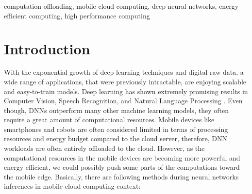\documentclass[conference,9pt]{IEEEtran}
\begin{document}
\begin{IEEEkeywords}
computation offloading, mobile cloud computing, deep neural networks, energy efficient computing, high performance computing
\end{IEEEkeywords}

\section{Introduction}
With the exponential growth of deep learning techniques and digital raw data, a wide range of applications, that were previously intractable, are enjoying scalable and easy-to-train models. Deep learning has shown extremely promising results in Computer Vision\cite{b1}\cite{b2}, Speech Recognition\cite{b3}, and Natural Language Processing \cite{b4}. Even though, DNNs outperform many other machine learning models, they often require a great amount of computational resources. Mobile devices like smartphones and robots are often considered limited in terms of processing resources and energy budget compared to the cloud server, therefore, DNN workloads are often entirely offloaded to the cloud. However, as the computational resources in the mobile devices are becoming more powerful and energy efficient, we could possibly push some parts of the computations toward the mobile edge.
Basically, there are following methods during neural networks inferences in mobile cloud computing context:
\end{document}
